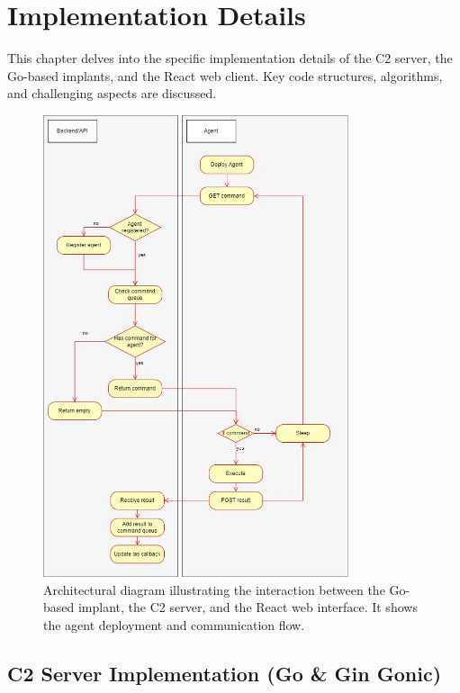 \chapter{Implementation Details}
\label{chap:implementation}

This chapter delves into the specific implementation details of the C2 server, the Go-based implants, and the React web client. Key code structures, algorithms, and challenging aspects are discussed.

\begin{figure}[H]
    \centering
    \includegraphics[width=0.8\textwidth]{../includegraphics/diagramm.png} %
    \caption{Architectural diagram illustrating the interaction between the Go-based implant, the C2 server, and the React web interface. It shows the agent deployment and communication flow.}
    \label{fig:architecture_diagram}
\end{figure}

\section{C2 Server Implementation (Go \& Gin Gonic)}

